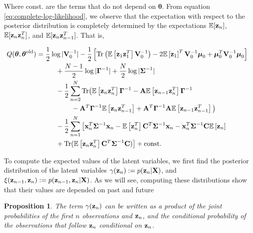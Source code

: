 \documentclass[11pt]{article}
\numberwithin{equation}{section}
\newcommand{\expectation}[1]{\mathbb{E}\left[#1\right]}
\newcommand{\x}{{\bf x}}
\newcommand{\z}{{\bf z}}
\newtheorem{proposition}{Proposition}[section]
\begin{document}
Where const. are the terms that do not depend on $\boldsymbol{\theta}$. From equation \eqref{eq:complete-log-likelihood}, we observe that the expectation with respect to the posterior distribution is completely determined by the expectations $\mathbb{E}[\z_n]$, $\mathbb{E}[\z_n\z_{n}^{T}]$, and  $\mathbb{E}[\z_n\z_{n-1}^{T}]$. That is,

\begin{align}
	Q(\boldsymbol\theta, \boldsymbol\theta^\text{old}) &= \frac{1}{2}\log \vert
	  {\bf V}_0^{-1}\vert -\frac{1}{2}\left[\text{Tr}\left(\mathbb{E}\left[\z_1 \z_1^T\right] {\bf V}_0^{-1}\right) -2 \mathbb{E}\left[\z_1\right]^T{\bf V}_0^{-1}\boldsymbol\mu_0 + \boldsymbol\mu_0^T {\bf V}_0^{-1}\boldsymbol\mu_0\right] \nonumber \\
	  &\hspace{1cm}+ \frac{N-1}{2}\log\vert\boldsymbol\Gamma^{-1}\vert + \frac{N}{2}\log\vert \boldsymbol\Sigma^{-1}\vert \nonumber \\
	  &\hspace{1cm}-\frac{1}{2} \sum_{n=2}^{N}\text{Tr}\big(\expectation{\z_n\z_n^T}\boldsymbol\Gamma^{-1} - {\bf A}\expectation{\z_{n-1}\z_n^T}\boldsymbol\Gamma^{-1} \nonumber\\
	  &\hspace{1.8cm} - {\bf A}^T\boldsymbol{\Gamma}^{-1}\expectation{\z_n\z_{n-1}^T} + {\bf A}^T\boldsymbol\Gamma^{-1}{\bf A}\expectation{\z_{n-1}\z_{n-1}^T}\big) \nonumber\\
	  &\hspace{1cm}-\frac{1}{2}\sum_{n=1}^N\big[\x_n^T\boldsymbol{\Sigma}^{-1}\x_n-\expectation{\z_n^T}{\bf C}^T \boldsymbol\Sigma^{-1}\x_n - \x_n^T\boldsymbol\Sigma^{-1}{\bf C}\expectation{\z_n} \nonumber\\
	  &\hspace{1cm} + \text{Tr}(\mathbb{E}\left[\z_n\z_n^T\right]{\bf C}^T\boldsymbol\Sigma^{-1}{\bf C})\big] + \text{const.}  \label{eq:Q-LDS}
\end{align}


To compute the expected values of the latent variables, we first find the posterior distribution of the latent variables $\gamma(\z_n) := p(\z_n\vert {\bf X})$, and $\xi(\z_{n-1}, \z_{n}) := p(\z_{n-1}, \z_n\vert {\bf X})$. As we will see, computing these distributions show that their values are depended on past and future 


\begin{proposition}\label{prop:gamma-factorisation}
	The term $\gamma(\z_n)$ can be written as a product of the joint probabilities of the first $n$ observations and $\z_n$, and the conditional probability of the observations that follow $\z_n$ conditional on $\z_n$.
\end{proposition}
\end{document}
